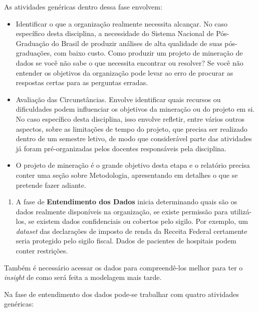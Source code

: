 \documentclass[]{article}
\providecommand{\tightlist}{%
  \setlength{\itemsep}{0pt}\setlength{\parskip}{0pt}}
\begin{document}
As atividades genéricas dentro dessa fase envolvem:

\begin{itemize}
\item
  Identificar o que a organização realmente necessita alcançar. No caso
  específico desta disciplina, a necessidade do Sistema Nacional de
  Pós-Graduação do Brasil de produzir análises de alta qualidade de suas
  pós-graduações, com baixo custo. Como produzir um projeto de mineração
  de dados se você não sabe o que necessita encontrar ou resolver? Se
  você não entender os objetivos da organização pode levar ao erro de
  procurar as respostas certas para as perguntas erradas.
\item
  Avaliação das Circunstâncias. Envolve identificar quais recursos ou
  dificuldades podem influenciar os objetivos da mineração ou do projeto
  em si. No caso específico desta disciplina, isso envolve refletir,
  entre vários outros aspectos, sobre as limitações de tempo do projeto,
  que precisa ser realizado dentro de um semestre letivo, de modo que
  considerável parte das atividades já foram pré-organizadas pelos
  docentes responsáveis pela disciplina.
\item
  O projeto de mineração é o grande objetivo desta etapa e o relatório
  precisa conter uma seção sobre Metodologia, apresentando em detalhes o
  que se pretende fazer adiante.
\end{itemize}

\begin{enumerate}
\def\labelenumi{\arabic{enumi}.}
\setcounter{enumi}{1}
\tightlist
\item
  A fase de \textbf{Entendimento dos Dados} inicia determinando quais
  são os dados realmente disponíveis na organização, se existe permissão
  para utilizá-los, se existem dados confidenciais ou cobertos pelo
  sigilo. Por exemplo, um \emph{dataset} das declarações de imposto de
  renda da Receita Federal certamente seria protegido pelo sigilo
  fiscal. Dados de pacientes de hospitais podem conter restrições.
\end{enumerate}

Também é necessário acessar os dados para compreendê-los melhor para ter
o \emph{insight} de como será feita a modelagem mais tarde.

Na fase de entendimento dos dados pode-se trabalhar com quatro
atividades genéricas:
\end{document}
